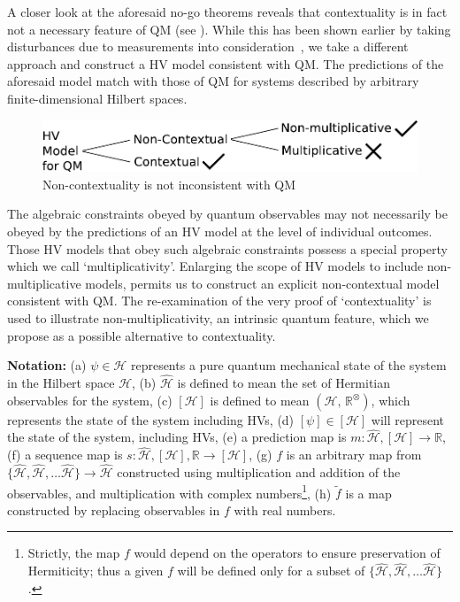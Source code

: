\documentclass[british,aps,prl,superscriptaddress,nofootinbib,times,reprint]{revtex4-1}
\theoremstyle{plain}
\theoremstyle{definition}
\theoremstyle{remark}
\theoremstyle{remark}
\theoremstyle{remark}
\theoremstyle{plain}
\theoremstyle{plain}
\theoremstyle{plain}
\theoremstyle{definition}
\theoremstyle{definition}
\begin{document}
A closer look at the aforesaid no-go theorems
reveals that contextuality is in fact not a
necessary feature of QM (see ).
While this has been shown earlier by taking
disturbances due to measurements into
consideration~\cite{NoContextuality,LaCourNoCntx},
we take a different approach and construct a
HV model consistent with QM.  The predictions of
the aforesaid model match with those of QM for systems
described by arbitrary finite-dimensional Hilbert
spaces.  \begin{figure}[h]
\includegraphics[width=0.9\columnwidth]{block1}
\caption{Non-contextuality is not inconsistent
with QM} \label{fig:block}\end{figure} The
algebraic constraints obeyed by quantum
observables may not necessarily be obeyed by the
predictions of an HV model at the level of
individual outcomes.  Those HV models that obey
such algebraic constraints possess a special
property which we call `multiplicativity'.  
Enlarging the scope of HV models to include
non-multiplicative models, permits us to construct an
explicit non-contextual model consistent with QM.
The re-examination of the very proof of
`contextuality'  is used to illustrate
non-multiplicativity, an intrinsic quantum feature, 
which we propose as a possible alternative to contextuality. 


{\noindent \bf Notation:} (a) $\psi\in\mathcal{H}$ 
represents a pure quantum mechanical
state of the system in the Hilbert space
$\mathcal{H}$, (b) $\hat{\mathcal{H}}$ is defined
to mean the set of Hermitian 
observables for the system, (c)
$[\mathcal{H}]$ is defined to mean
$(\mathcal{H},\,\mathbb{R}^{\otimes})$, which
represents the state of the system including HVs,
(d) $[\psi]\in[\mathcal{H}]$ will represent the
state of the system, including HVs, (e) a
prediction map is
$m:\hat{\mathcal{H}},[\mathcal{H}]\to\mathbb{R}$,
(f) a sequence map is
$s:\hat{\mathcal{H}},[\mathcal{H}],\mathbb{R}\to[\mathcal{H}]$,
(g) $f$ is an arbitrary map from $\{
\hat{\mathcal{H}},\hat{\mathcal{H}},\dots\hat{\mathcal{H}}
\} \to \hat{\mathcal{H}}$ constructed using
multiplication and addition of the observables,
and multiplication with complex
numbers\footnote{Strictly, the map $f$ would
depend on the operators to ensure preservation of
Hermiticity; thus a given $f$ will be defined only
for a subset of $\{
\hat{\mathcal{H}},\hat{\mathcal{H}},\dots\hat{\mathcal{H}}
\}$.}, (h) $\tilde{f}$ is a map constructed by
replacing observables in $f$ with real numbers.
\end{document}
